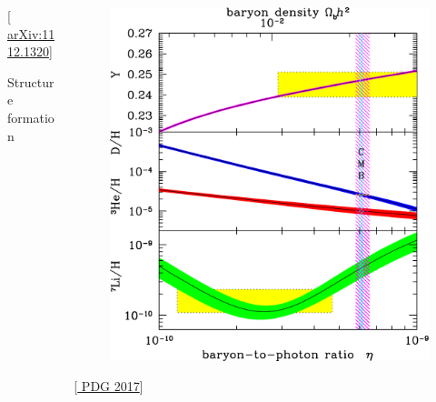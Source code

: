 \documentclass[10pt,aspectratio=169]{beamer}
\begin{document}
\begin{frame}
\begin{columns}[t]
\begin{column}{0.3\textwidth}
\begin{figure}
      \end{figure}
      \vspace*{-20pt}
      \begin{center}
        { \tiny [\href{http://arxiv.org/abs/1112.1320}{%
              arXiv:1112.1320}] }
      \end{center}
      \vspace*{-20pt}
      \begin{center}
        Structure formation
      \end{center}
    \end{column}
    \begin{column}{0.3\textwidth}
      \begin{figure}
        \includegraphics[width=\textwidth]{bbn}
      \end{figure}
      \vspace*{-25pt}
      \begin{center}
        { \tiny [\href{http://pdg.lbl.gov/2017/reviews/rpp2017-rev-bbang-nucleosynthesis.pdf}{%
              PDG 2017}] }
      \end{center}
      \vspace*{-15pt}
      \begin{center}

\end{center}
\end{column}
\end{columns}
\end{frame}
\end{document}
